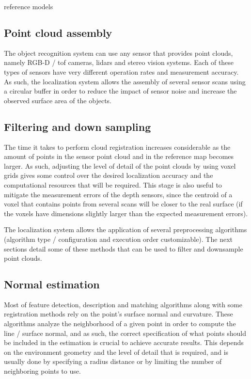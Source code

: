 reference models


\subsection{Point cloud assembly}

The object recognition system can use any sensor that provides point clouds, namely RGB-D / \gls{tof} cameras, \glspl{lidar} and stereo vision systems. Each of these types of sensors have very different operation rates and measurement accuracy. As such, the localization system allows the assembly of several sensor scans using a circular buffer in order to reduce the impact of sensor noise and increase the observed surface area of the objects.


\subsection{Filtering and down sampling}

The time it takes to perform cloud registration increases considerable as the amount of points in the sensor point cloud and in the reference map becomes larger. As such, adjusting the level of detail of the point clouds by using voxel grids gives some control over the desired localization accuracy and the computational resources that will be required. This stage is also useful to mitigate the measurement errors of the depth sensors, since the centroid of a voxel that contains points from several scans will be closer to the real surface (if the voxels have dimensions slightly larger than the expected measurement errors).

The localization system allows the application of several preprocessing algorithms (algorithm type / configuration and execution order customizable). The next sections detail some of these methods that can be used to filter and downsample point clouds.


\subsection{Normal estimation}

Most of feature detection, description and matching algorithms along with some registration methods rely on the point's surface normal and curvature. These algorithms analyze the neighborhood of a given point in order to compute the line / surface normal, and as such, the correct specification of what points should be included in the estimation is crucial to achieve accurate results. This depends on the environment geometry and the level of detail that is required, and is usually done by specifying a radius distance or by limiting the number of neighboring points to use.


